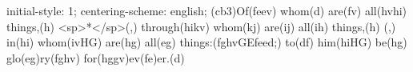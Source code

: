 initial-style: 1;
centering-scheme: english;
(cb3)Of(feev) whom(d) are(fv) all(hvhi) things,(h) <sp>*</sp>(,) through(hikv) whom(kj) are(ij) all(ih) things,(h) (,) in(hi) whom(ivHG) are(hg) all(eg) things:(fghvGEfeed;) to(df) him(hiHG) be(hg) glo(eg)ry(fghv) for(hggv)ev(fe)er.(d)
